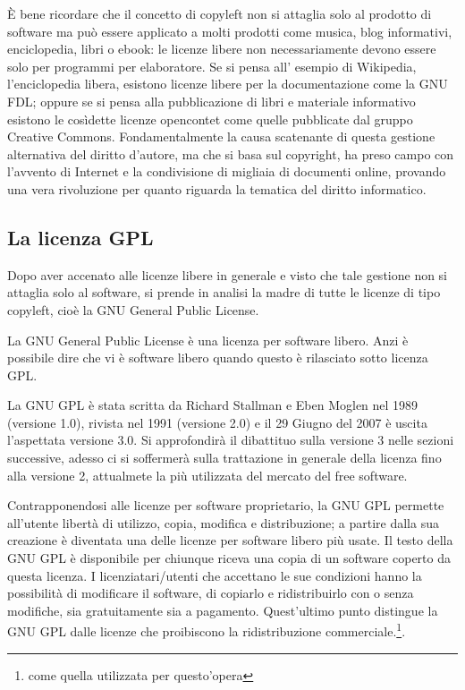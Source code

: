\`E bene ricordare che il concetto di copyleft non si attaglia solo al prodotto di software ma può essere applicato a molti prodotti come musica, blog informativi, enciclopedia, libri o ebook: le licenze libere non necessariamente devono essere solo per programmi per elaboratore. Se si pensa  all' esempio di Wikipedia, l'enciclopedia libera,  esistono licenze libere per la documentazione come la GNU FDL; oppure se si pensa alla pubblicazione di libri e materiale informativo esistono le cosìdette licenze opencontet come quelle pubblicate dal gruppo Creative Commons.
Fondamentalmente la causa scatenante di questa gestione alternativa del diritto d'autore, ma che si basa sul copyright, ha preso campo con l'avvento di Internet e la condivisione di migliaia di documenti online, provando una vera rivoluzione per quanto riguarda la tematica del diritto informatico.


\subsection{La licenza GPL}

Dopo aver accenato alle licenze libere in generale e visto che tale gestione non si attaglia solo al software, si prende in analisi la madre di tutte le licenze di tipo copyleft, cioè la GNU General Public License.

La GNU General Public License è una licenza per software libero. Anzi è possibile dire che vi è software libero quando questo è rilasciato sotto licenza GPL.

La GNU GPL è stata scritta da Richard Stallman e Eben Moglen nel 1989 (versione 1.0), rivista nel 1991 (versione 2.0) e il 29 Giugno del 2007 è uscita l'aspettata versione 3.0. Si approfondirà il dibattituo sulla versione 3 nelle sezioni successive, adesso ci si soffermerà sulla trattazione in generale della licenza fino alla versione 2, attualmete la più utilizzata del mercato del free software.

Contrapponendosi alle licenze per software proprietario, la GNU GPL permette all'utente libertà di utilizzo, copia, modifica e distribuzione; a partire dalla sua creazione è diventata una delle licenze per software libero più usate. Il testo della GNU GPL è disponibile per chiunque riceva una copia di un software coperto da questa licenza. I licenziatari/utenti che accettano le sue condizioni hanno la possibilità di modificare il software, di copiarlo e ridistribuirlo con o senza modifiche, sia gratuitamente sia a pagamento. Quest'ultimo punto distingue la GNU GPL dalle licenze che proibiscono la ridistribuzione commerciale.\footnote{come quella utilizzata per questo'opera}.


